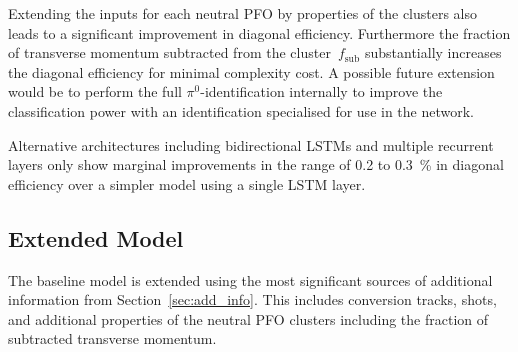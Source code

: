 Extending the inputs for each neutral PFO by properties of the clusters also
leads to a significant improvement in diagonal efficiency. Furthermore the
fraction of transverse momentum subtracted from the cluster~$f_\text{sub}$
substantially increases the diagonal efficiency for minimal complexity cost. A
possible future extension would be to perform the full $\pi^0$-identification
internally to improve the classification power with an identification
specialised for use in the network.

Alternative architectures including bidirectional LSTMs and multiple recurrent
layers only show marginal improvements in the range of \num{0.2} to
\SI{0.3}{\percent} in diagonal efficiency over a simpler model using a single
LSTM layer.

\subsection{Extended Model}
\label{sec:extended_model}

The baseline model is extended using the most significant sources of additional
information from Section~\ref{sec:add_info}. This includes conversion tracks,
shots, and additional properties of the neutral PFO clusters including the
fraction of subtracted transverse momentum.



